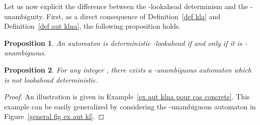 \documentclass[11pt]{elsarticle}
\newtheorem{proposition}{Proposition}
\newcommand\modif[2]{{#2}}
\begin{document}
\modif{}{Let us now explicit the difference between the -lookahead determinism and the -unambiguity. First, as a direct consequence of Definition~\ref{def kla} and Definition~\ref{def aut klna}, the following proposition holds.}
\begin{proposition}\label{prop eq k1na klh}
  An automaton is deterministic -lookahead if and only if it is  -unambiguous.
\end{proposition}
\modif{\begin{proof}
  Let  be an automaton,  be an integer and  be a state in .
  \begin{enumerate}
    \item Suppose that  is not -unambiguous. Hence there exists a word  of length  such that for any integer :
  
  \centerline{
    .
  }
  
  Then \modif{exists}{exist} two distinct states  and  in  such that    and .
  Either  and  is not deterministic (\emph{i.e.}  is not deterministic -lookahead), or  and by definition of  and , . Hence 
  
  \centerline{
    .
  }
  
  As a consequence,  is not deterministic -lookahead.
  
  \item Suppose that  is not deterministic -lookahead. Then there \modif{exists}{exist} three states ,  and  such that the transitions  and  belongs to  and . Hence there exists a word  of length  such that  and . Consequently the states  and  both belong to the set  and then  is not -unambiguous.
  \end{enumerate}
  
\end{proof}}{}

\begin{proposition}
  \modif{T}{For any integer , t}here exists  a \modif{}{}-unambiguous automaton which is  not \modif{-}{}lookahead deterministic\modif{ for any integer }{}. 
\end{proposition}
\begin{proof}
  An illustration is given in Example~\ref{ex aut klna pour cas concrets}.
  \modif{}{This example can be easily generalized by considering the -unambiguous automaton  in Figure~\ref{general fig ex aut kl}.}
\end{proof}
\end{document}
